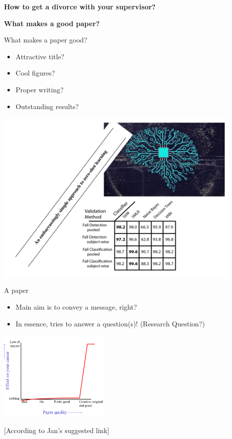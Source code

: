 \documentclass[aspectratio=169]{beamer}
\author{\authorlabel}
\newcommand{\myjokesubtitle}{\color{Pink}\Large{\textbf{How to get a divorce with your supervisor?}}}
\newcommand{\mysubtitle}{\color{Pink}\Large{\textbf{What makes a good paper?}}}
\begin{document}


\begin{frame}
	\centering
	\myjokesubtitle
\end{frame}

\begin{frame}
	\centering
	\mysubtitle
\end{frame}

\begin{frame}{What makes a paper good?}
\begin{minipage}{0.25\textwidth}
  \begin{itemize}
    \item Attractive title?
    \item Cool figures?
    \item Proper writing?
    \item Outstanding results?
  \end{itemize}
\end{minipage}%
\begin{minipage}{0.75\textwidth}
  \includegraphics[width=0.9\textwidth]{Figures/collect.pdf}
\end{minipage}
\end{frame}

\begin{frame}{A paper}
  \begin{itemize}
    \item Main aim is to convey a message, right?
    \item In essence, tries to answer a question(s)! (Research Question?)
  \end{itemize}
  \centering
  \includegraphics[width=0.4\textwidth]{Figures/quality.png}

    [According to Jan's suggested link]
\end{frame} 
\end{document}
